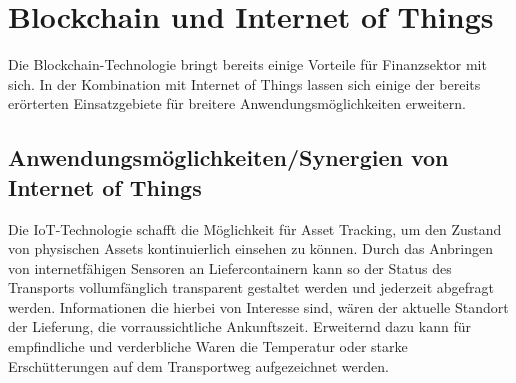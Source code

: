 \section{Blockchain und Internet of Things}
Die Blockchain-Technologie bringt bereits einige Vorteile für Finanzsektor mit sich.
In der Kombination mit Internet of Things lassen sich einige der bereits erörterten Einsatzgebiete
für breitere Anwendungsmöglichkeiten erweitern.

\subsection{Anwendungsmöglichkeiten/Synergien von Internet of Things}
Die IoT-Technologie schafft die Möglichkeit für Asset Tracking, um den Zustand von physischen Assets
kontinuierlich einsehen zu können. Durch das Anbringen von internetfähigen Sensoren an 
Liefercontainern kann so der Status des Transports vollumfänglich transparent gestaltet
werden und jederzeit abgefragt werden. 
Informationen die hierbei von Interesse sind, wären der aktuelle Standort der Lieferung,
die vorraussichtliche Ankunftszeit. Erweiternd dazu kann für empfindliche und 
verderbliche Waren die Temperatur oder starke Erschütterungen auf dem Transportweg
aufgezeichnet werden.



\cite[p.~169]{chowdhary2025smart}